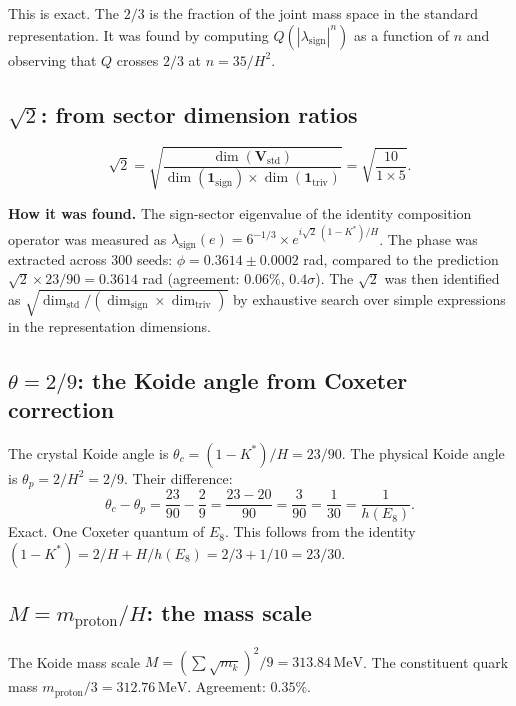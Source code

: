 \documentclass[11pt,a4paper]{article}
\theoremstyle{definition}
\theoremstyle{remark}
\begin{document}
This is exact. The $2/3$ is the fraction of the joint mass space in the standard representation. It was found by computing $Q(|\lambda_{\mathrm{sign}}|^n)$ as a function of $n$ and observing that $Q$ crosses $2/3$ at $n = 35/H^2$.

\subsection{$\sqrt{2}$: from sector dimension ratios}

\begin{equation}
\sqrt{2} = \sqrt{\frac{\dim(\mathbf{V}_{\mathrm{std}})}{\dim(\mathbf{1}_{\mathrm{sign}}) \times \dim(\mathbf{1}_{\mathrm{triv}})}} = \sqrt{\frac{10}{1 \times 5}}.
\end{equation}

\textbf{How it was found.} The sign-sector eigenvalue of the identity composition operator was measured as $\lambda_{\mathrm{sign}}(e) = 6^{-1/3} \times e^{i\sqrt{2}\,(1-K^*)/H}$. The phase was extracted across 300 seeds: $\phi = 0.3614 \pm 0.0002$ rad, compared to the prediction $\sqrt{2} \times 23/90 = 0.3614$ rad (agreement: $0.06\%$, $0.4\sigma$). The $\sqrt{2}$ was then identified as $\sqrt{\dim_{\mathrm{std}}/(\dim_{\mathrm{sign}} \times \dim_{\mathrm{triv}})}$ by exhaustive search over simple expressions in the representation dimensions.

\subsection{$\theta = 2/9$: the Koide angle from Coxeter correction}

The crystal Koide angle is $\theta_c = (1-K^*)/H = 23/90$. The physical Koide angle is $\theta_p = 2/H^2 = 2/9$. Their difference:
\begin{equation}
\theta_c - \theta_p = \frac{23}{90} - \frac{2}{9} = \frac{23 - 20}{90} = \frac{3}{90} = \frac{1}{30} = \frac{1}{h(E_8)}.
\end{equation}
Exact. One Coxeter quantum of $E_8$. This follows from the identity $(1-K^*) = 2/H + H/h(E_8) = 2/3 + 1/10 = 23/30$.

\subsection{$M = m_{\mathrm{proton}}/H$: the mass scale}

The Koide mass scale $M = (\sum\sqrt{m_k})^2 / 9 = 313.84\,\mathrm{MeV}$. The constituent quark mass $m_{\mathrm{proton}}/3 = 312.76\,\mathrm{MeV}$. Agreement: $0.35\%$.
\end{document}

